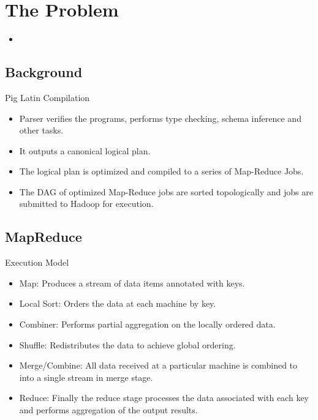 \section{The Problem}
\begin{frame}
\begin{itemize}
  \item %
\end{itemize}
\end{frame}

\subsection{Background}
\begin{frame}{Pig Latin Compilation}
\begin{itemize}
	\item Parser verifies the programs, performs type checking, schema inference and other tasks.
	\item It outputs a canonical logical plan.
	\item The logical plan is optimized and compiled to a series of Map-Reduce Jobs.
	\item The DAG of optimized Map-Reduce jobs are sorted topologically and jobs are submitted to Hadoop for execution. 
\end{itemize}
\end{frame}

\subsection{MapReduce}
\begin{frame}{Execution Model}
\begin{itemize}
	\item Map: Produces a stream of data items annotated with keys.
	\item Local Sort: Orders the data at each machine by key.
	\item Combiner: Performs partial aggregation on the locally ordered data.
	\item Shuffle: Redistributes the data to achieve global ordering.
	\item Merge/Combine: All data received at a particular machine is combined to into a single stream in merge stage.
	\item Reduce: Finally the reduce stage processes the data associated with each key and performs aggregation of the output results.
\end{itemize}
\end{frame}

